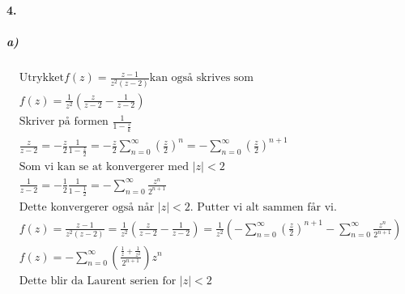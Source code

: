 \documentclass[11pt, A4paper,norsk]{article}
\begin{document}
		\paragraph{4.}
			\subparagraph{a)}
				\begin{gather*}
\text{Utrykket} f(z) = \frac{z - 1}{z^2 (z - 2)} \text{kan også skrives som} \\
f(z) = \frac{1}{z^2}\left( \frac{z}{z - 2} - \frac{1}{z - 2} \right) \\
\text{Skriver på formen $\frac{1}{1 - \frac{z}{k}}$} \\
\frac{z}{z - 2} = - \frac{z}{2} \frac{1}{1 - \frac{z}{2}} = - \frac{z}{2} \sum_{n = 0}^{\infty} \left( \frac{z}{2} \right)^n = - \sum_{n = 0}^{\infty} \left( \frac{z}{2} \right)^{n + 1} \\
\text{Som vi kan se at konvergerer med $|z| < 2$} \\
\frac{1}{z - 2} = - \frac{1}{2} \frac{1}{1 - \frac{1}{2}} = - \sum_{n = 0}^{\infty} \frac{z^n}{2^{n + 1}} \\
\text{Dette konvergerer også når $|z| < 2$. Putter vi alt sammen får vi.} \\
f(z) = \frac{z - 1}{z^2(z - 2)} = \frac{1}{z^2} \left( \frac{z}{z - 2} - \frac{1}{z - 2} \right) = \frac{1}{z^2} \left( - \sum_{n = 0}^{\infty} \left( \frac{z}{2} \right)^{n + 1} - \sum_{n = 0}^{\infty} \frac{z^n}{2^{n + 1}} \right) \\
f(z) = - \sum_{n = 0}^{\infty} \left( \frac{\frac{1}{z} + \frac{1}{z^2}}{2^{n + 1}} \right)z^n \\
\text{Dette blir da Laurent serien for $|z| < 2$}
				\end{gather*}
\end{document}

